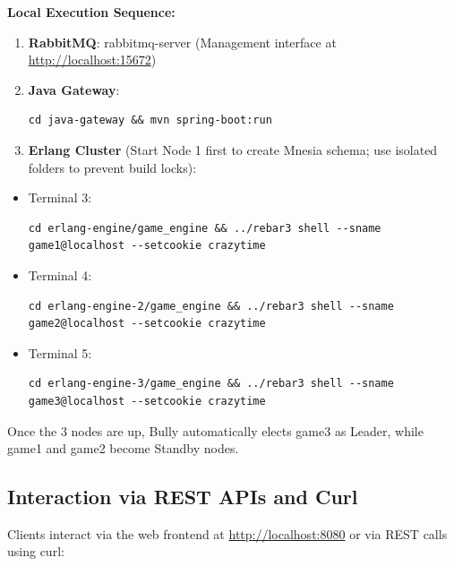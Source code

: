 \documentclass[12pt,a4paper]{article}
\begin{document}
\textbf{Local Execution Sequence:}
\begin{enumerate}
    \item \textbf{RabbitMQ}: rabbitmq-server (Management interface at \url{http://localhost:15672})
    \item \textbf{Java Gateway}: 
\begin{lstlisting}[basicstyle=\ttfamily, breaklines=true]
cd java-gateway && mvn spring-boot:run
\end{lstlisting}
    \item \textbf{Erlang Cluster} (Start Node 1 first to create Mnesia schema; use isolated folders to prevent build locks):
\end{enumerate}
\begin{itemize}
    \item Terminal 3: 
\begin{lstlisting}[basicstyle=\ttfamily, breaklines=true]
cd erlang-engine/game_engine && ../rebar3 shell --sname game1@localhost --setcookie crazytime
\end{lstlisting}
\clearpage
    \item Terminal 4: 
\begin{lstlisting}[basicstyle=\ttfamily, breaklines=true]
cd erlang-engine-2/game_engine && ../rebar3 shell --sname game2@localhost --setcookie crazytime
\end{lstlisting}
    \item Terminal 5: 
\begin{lstlisting}[basicstyle=\ttfamily, breaklines=true]
cd erlang-engine-3/game_engine && ../rebar3 shell --sname game3@localhost --setcookie crazytime
\end{lstlisting}
\end{itemize}
Once the 3 nodes are up, Bully automatically elects game3 as Leader, while game1 and game2 become Standby nodes.

\subsection{Interaction via REST APIs and Curl}
Clients interact via the web frontend at \url{http://localhost:8080} or via REST calls using curl:
\end{document}
